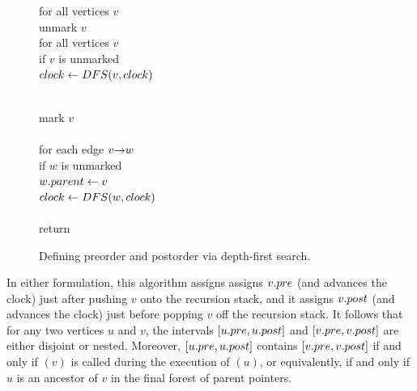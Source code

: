 \begin{figure}[ht]
\centering
\begin{minipage}[c]{0.44\linewidth}
\begin{pseudocode}
\\
\\
for all vertices $v$\\
\Indent unmark $v$\\
for all vertices $v$\\
\Indent if $v$ is unmarked\\
\Indent\Indent $clock \gets DFS(v, clock)$
\end{pseudocode}
\end{minipage}\hfill
\begin{minipage}[c]{0.52\linewidth}
\begin{pseudocode}
\\
mark $v$\\
\\
for each edge $v\mathord{\rightarrow}w$\\
\Indent if $w$ is unmarked\\
\Indent\Indent $w.parent \gets v$\\
\Indent\Indent $clock \gets DFS(w, clock)$\\
\\
return 
\end{pseudocode}
\end{minipage}
\caption{Defining preorder and postorder via depth-first search.}
\label{fig:6.3}
\end{figure}

In either formulation, this algorithm assigns assigns $v.pre$ (and advances the clock) just after pushing $v$ onto the recursion stack, and it assigns $v.post$ (and advances the clock) just before popping $v$ off the recursion stack.
It follows that for any two vertices $u$ and $v$, the intervals $[u.pre, u.post]$ and $[v.pre, v.post]$ are either disjoint or nested.
Moreover, $[u.pre, u.post]$ contains $[v.pre, v.post]$ if and only if $(v)$ is called during the execution of $(u)$, or equivalently, if and only if $u$ is an ancestor of $v$ in the final forest of parent pointers.


